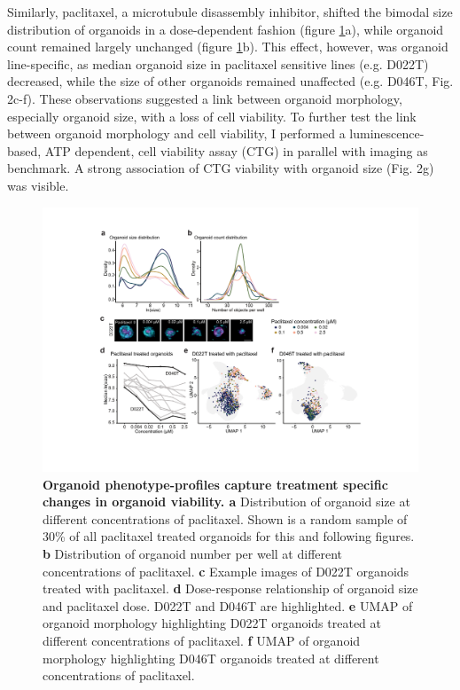\begin{flushleft}
Similarly, paclitaxel, a microtubule disassembly inhibitor, shifted the bimodal size distribution of organoids in a dose-dependent fashion (figure \ref{fig_161}a), while organoid count remained largely unchanged (figure \ref{fig_161}b). This effect, however, was organoid line-specific, as median organoid size in paclitaxel sensitive lines (e.g. D022T) decreased, while the size of other organoids remained unaffected (e.g. D046T, Fig. 2c-f). These observations suggested a link between organoid morphology, especially organoid size, with a loss of cell viability. To further test the link between organoid morphology and cell viability, I performed a luminescence-based, ATP dependent, cell viability assay (CTG) in parallel with imaging as benchmark. A strong association of CTG viability with organoid size (Fig. 2g) was visible. 


\begin{figure}[h]
\centering
\includegraphics[width=\textwidth,
                height=\textheight,
                keepaspectratio]{figures/pdf/fig_161.pdf}
\caption{\textbf{Organoid phenotype-profiles capture treatment specific changes in organoid viability. a} Distribution of organoid size at different concentrations of paclitaxel. Shown is a random sample of 30\% of all paclitaxel treated organoids for this and following figures. \textbf{b} Distribution of organoid number per well at different concentrations of paclitaxel. \textbf{c} Example images of D022T organoids treated with paclitaxel. \textbf{d} Dose-response relationship of organoid size and paclitaxel dose. D022T and D046T are highlighted. \textbf{e} UMAP of organoid morphology highlighting D022T organoids treated at different concentrations of paclitaxel. \textbf{f} UMAP of organoid morphology highlighting D046T organoids treated at different concentrations of paclitaxel.}
\label{fig_161}
\end{figure}
\bigbreak


\end{flushleft}
